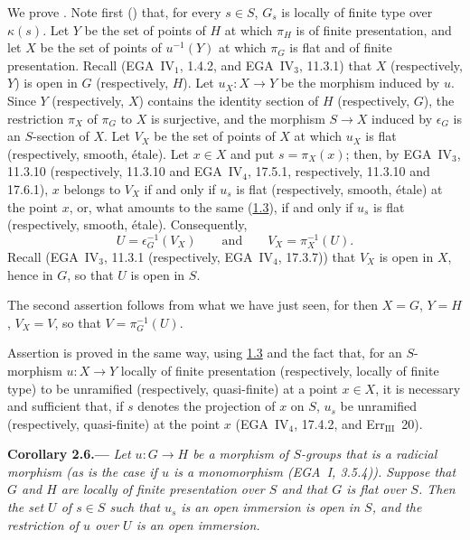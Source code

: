 We prove \textup{}. Note first () that, for every
\(s\in S\), \(G_s\) is locally of finite type over \(\kappa(s)\). Let \(Y\)
be the set of points of \(H\) at which \(\pi_H\) is of finite
presentation, and let \(X\) be the set of points of \(u^{-1}(Y)\) at which
\(\pi_G\) is flat and of finite presentation. Recall (EGA~IV\(_1\), 1.4.2,
and EGA~IV\(_3\), 11.3.1) that \(X\) (respectively, \(Y\)) is open in \(G\)
(respectively, \(H\)). Let \(u_X:X\to Y\) be the morphism induced by
\(u\). Since \(Y\) (respectively, \(X\)) contains the identity section of
\(H\) (respectively, \(G\)), the restriction \(\pi_X\) of \(\pi_G\) to
\(X\) is surjective, and the morphism \(S\to X\) induced by
\(\epsilon_G\) is an \(S\)-section of \(X\). Let \(V_X\) be the set of
points of \(X\) at which \(u_X\) is flat (respectively, smooth, \'etale).
Let \(x\in X\) and put \(s=\pi_X(x)\); then, by EGA~IV\(_3\), 11.3.10
(respectively, 11.3.10 and EGA~IV\(_4\), 17.5.1, respectively, 11.3.10 and
17.6.1), \(x\) belongs to \(V_X\) if and only if \(u_s\) is flat
(respectively, smooth, \'etale) at the point \(x\), or, what amounts to the
same (\hyperref[prop:sga3-VIB-1.3]{1.3}), if and only if \(u_s\) is flat (respectively, smooth,
\'etale). Consequently,
\[
  U=\epsilon_G^{-1}(V_X)
  \qquad\text{and}\qquad
  V_X=\pi_X^{-1}(U).
\]
Recall (EGA~IV\(_3\), 11.3.1 (respectively, EGA~IV\(_4\), 17.3.7)) that
\(V_X\) is open in \(X\), hence in \(G\), so that \(U\) is open in \(S\).

The second assertion follows from what we have just seen, for then
\(X=G\), \(Y=H\), \(V_X=V\), so that \(V=\pi_G^{-1}(U)\).

Assertion \textup{} is proved in the same way, using \hyperref[prop:sga3-VIB-1.3]{1.3} and the
fact that, for an \(S\)-morphism \(u:X\to Y\) locally of finite
presentation (respectively, locally of finite type) to be unramified
(respectively, quasi-finite) at a point \(x\in X\), it is necessary and
sufficient that, if \(s\) denotes the projection of \(x\) on \(S\), \(u_s\)
be unramified (respectively, quasi-finite) at the point \(x\)
(EGA~IV\(_4\), 17.4.2, and Err\(_{\mathrm{III}}\)~20).

\medskip
{}\label{cor:sga3-VIB-2.6}%
\noindent\textbf{Corollary 2.6.---}
\emph{Let \(u:G\to H\) be a morphism of \(S\)-groups that is a
radicial morphism (as is the case if \(u\) is a monomorphism
\textup(EGA~I, 3.5.4\textup)). Suppose that \(G\) and \(H\) are locally
of finite presentation over \(S\) and that \(G\) is flat over \(S\).
Then the set \(U\) of \(s\in S\) such that
\(u_s\) is an open immersion is open in \(S\), and the restriction
of \(u\) over \(U\) is an open immersion.}

